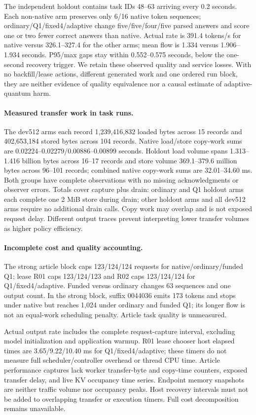 \documentclass[10pt]{article}
\begin{document}
The independent holdout contains task IDs 48--63 arriving every 0.2 seconds. Each non-native arm preserves only 6/16 native token sequences; ordinary/Q1/fixed4/adaptive change five/five/four/five parsed answers and score one or two fewer correct answers than native. Actual rate is 391.4 tokens/s for native versus 326.1--327.4 for the other arms; mean flow is 1.334 versus 1.906--1.934 seconds. P95/max gaps stay within 0.552--0.575 seconds, below the one-second recovery trigger. We retain these observed quality and service losses. With no backfill/lease actions, different generated work and one ordered run block, they are neither evidence of quality equivalence nor a causal estimate of adaptive-quantum harm.

\paragraph{Measured transfer work in task runs.}
The dev512 arms each record 1,239,416,832 loaded bytes across 15 records and 402,653,184 stored bytes across 104 records. Native load/store copy-work sums are 0.02224--0.02279/0.00886--0.00899 seconds. Holdout load volume spans 1.313--1.416 billion bytes across 16--17 records and store volume 369.1--379.6 million bytes across 96--101 records; combined native copy-work sums are 32.01--34.60 ms. Both groups have complete observations with no missing acknowledgments or observer errors. Totals cover capture plus drain: ordinary and Q1 holdout arms each complete one 2 MiB store during drain; other holdout arms and all dev512 arms require no additional drain calls. Copy work may overlap and is not exposed request delay. Different output traces prevent interpreting lower transfer volumes as higher policy efficiency.

\paragraph{Incomplete cost and quality accounting.}
The strong article block caps 123/124/124 requests for native/ordinary/funded Q1; lease R01 caps 123/124/123 and R02 caps 123/124/124 for Q1/fixed4/adaptive. Funded versus ordinary changes 63 sequences and one output count. In the strong block, suffix 0044036 emits 173 tokens and stops under native but reaches 1,024 under ordinary and funded Q1; its longer flow is not an equal-work scheduling penalty. Article task quality is unmeasured.

Actual output rate includes the complete request-capture interval, excluding model initialization and application warmup. R01 lease chooser host elapsed times are 3.65/9.22/10.40 ms for Q1/fixed4/adaptive; these timers do not measure full scheduler/controller overhead or thread CPU time. Article performance captures lack worker transfer-byte and copy-time counters, exposed transfer delay, and live KV occupancy time series. Endpoint memory snapshots are neither traffic volume nor occupancy peaks. Host recovery intervals must not be added to overlapping transfer or execution timers. Full cost decomposition remains unavailable.
\end{document}
